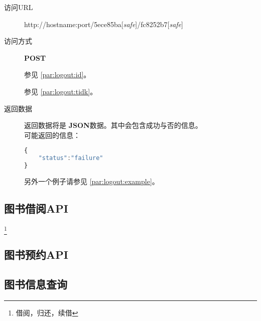 \documentclass[UTF8]{ctexart}
\def\safe{[\textit{safe}]}
\def\POST{\textbf{POST}}
\def\bfJSON{\textbf{JSON}}
\def\viaurl#1{\item[访问URL] #1}
\def\viareq#1{\item[访问方式] #1}
\def\rtdata{\item[返回数据]}
\begin{document}
        
        
        
        
        \begin{description}
            \viaurl http://hostname:port/5ece85ba\safe/fc8252b7\safe
            
            \viareq \POST
            
            参见 \ref{par:logout:id}。
            
            参见 \ref{par:logout:tidk}。
            
            
            \rtdata 返回数据将是 \bfJSON 数据。其中会包含成功与否的信息。
            \\可能返回的信息：
            \begin{lstlisting}[language=JavaScript]
{
    "status":"failure"
}
            \end{lstlisting}
            另外一个例子请参见 \ref{par:logout:example}。
        \end{description}
        
        
\subsection{图书借阅API}
        \footnote{借阅，归还，续借}
        \subsection{图书预约API}
        \subsection{图书信息查询}
\end{document}
